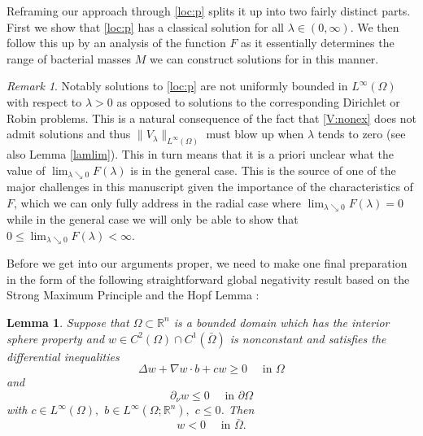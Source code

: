 \documentclass[12pt,a4paper]{amsart}
\def\na{\nabla}
\newtheorem{lemma}[theorem]{Lemma}
\theoremstyle{definition}
\theoremstyle{remark}
\newtheorem{remark}[theorem]{Remark}
\numberwithin{equation}{section}
\numberwithin{theorem}{section}
\begin{document}
Reframing our approach through \eqref{loc:p} splits it up into two fairly distinct parts. First we show that \eqref{loc:p} has a classical solution for all $\lambda \in (0,\infty)$. We then follow this up by an analysis of the function $F$ as it essentially determines the range of bacterial masses $M$ we can construct solutions for in this manner.

\begin{remark}\label{rem:compl}
Notably solutions to \eqref{loc:p} are not uniformly bounded in $L^\infty(\Omega)$ with respect to $\lambda>0$ as opposed to solutions to the corresponding Dirichlet or Robin problems. This is a natural consequence of the fact that \eqref{V:nonex} does not admit solutions and thus $\|V_\lambda\|_{L^\infty(\Omega)}$ must blow up when $\lambda$ tends to zero (see also Lemma \ref{lamlim}). This in turn means that it is a priori unclear what the value of $\lim_{\lambda\searrow 0}F(\lambda)$ is in the general case. This is the source of one of the major challenges in this manuscript given the importance of the characteristics of $F$, which we can only fully address in the radial case where $\lim_{\lambda\searrow 0}F(\lambda) = 0$ while in the general case we will only be able to show that $0 \leq \lim_{\lambda\searrow 0}F(\lambda) < \infty$.
\end{remark}
%
Before we get into our arguments proper, we need to make one final preparation in the form of the following straightforward global negativity 	result based on the Strong Maximum Principle and the Hopf Lemma \cite{GiT, HanLin}:  
\begin{lemma}\label{MP:lem}
	Suppose that $\Omega\subset\mathbb{R}^n$ is a bounded domain which has the interior sphere property and $w\in C^2(\Omega)\cap C^1(\bar{\Omega})$ is nonconstant and satisfies the differential inequalities
	\begin{equation}\label{MP:ineq}
		\Delta w+\na w\cdot b+ cw\geq 0\quad \text{ in }\Omega 
	\end{equation} 
	and 
	\begin{equation}\label{MP:dird}
		\partial_{\nu}w \leq 0 \quad \text{ in }\partial\Omega 
	\end{equation}  
	with $c\in L^\infty(\Omega),$ $b\in L^\infty(\Omega;\mathbb{R}^n),$ $c\leq 0$. Then
	\begin{equation}\label{MP:neg}
		w < 0 \quad \text{ in }\bar{\Omega}.
	\end{equation}
\end{lemma}
\end{document}
